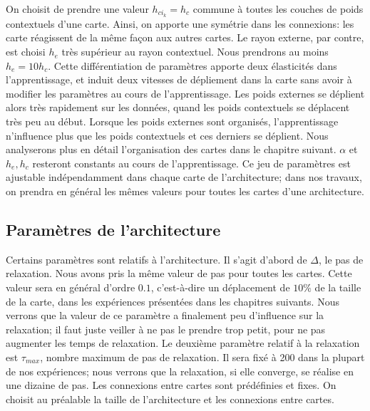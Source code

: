 \documentclass[../main]{subfiles}
\begin{document}
On choisit de prendre une valeur $h_{ci_k} = h_c$ commune à toutes les couches de poids contextuels d'une carte. Ainsi, on apporte une symétrie dans les connexions: les carte réagissent de la même façon aux autres cartes. Le rayon externe, par contre, est choisi $h_e$ très supérieur au rayon contextuel. Nous prendrons au moins $h_e = 10 h_c$. Cette différentiation de paramètres apporte deux élasticités dans l'apprentissage, et induit deux vitesses de dépliement dans la carte sans avoir à modifier les paramètres au cours de l'apprentissage. Les poids externes se déplient alors très rapidement sur les données, quand les poids contextuels se déplacent très peu au début. Lorsque les poids externes sont organisés, l'apprentissage n'influence plus que les poids contextuels et ces derniers se déplient. Nous analyserons plus en détail l'organisation des cartes dans le chapitre suivant.
$\alpha$ et $h_e, h_c$ resteront constants au cours de l'apprentissage.
Ce jeu de paramètres est ajustable indépendamment dans chaque carte de l'architecture; dans nos travaux, on prendra en général les mêmes valeurs pour toutes les cartes d'une architecture.

\subsection{Paramètres de l'architecture}
Certains paramètres sont relatifs à l'architecture. Il s'agit d'abord de $\Delta$, le pas de relaxation. Nous avons pris la même valeur de pas pour toutes les cartes. Cette valeur sera en général d'ordre $0.1$, c'est-à-dire un déplacement de $10\%$ de la taille de la carte, dans les expériences présentées dans les chapitres suivants. Nous verrons que la valeur de ce paramètre a finalement peu d'influence sur la relaxation; il faut juste veiller à ne pas le prendre trop petit, pour ne pas augmenter les temps de relaxation. Le deuxième paramètre relatif à la relaxation est $\tau_{max}$, nombre maximum de pas de relaxation. Il sera fixé à 200 dans la plupart de nos expériences; nous verrons que la relaxation, si elle converge, se réalise en une dizaine de pas.
Les connexions entre cartes sont prédéfinies et fixes.
On choisit au préalable la taille de l'architecture et les connexions entre cartes.
\end{document}
